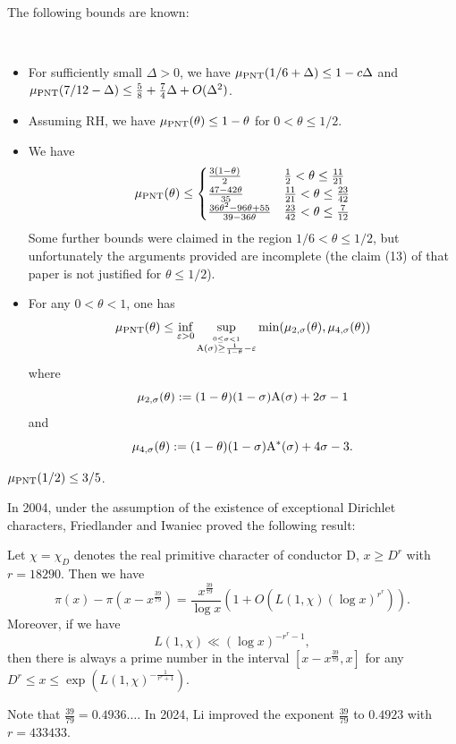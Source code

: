 The following bounds are known:

\begin{lemma}[Bounds on $\mu$]\label{baz-bound}\
  \begin{itemize}
  \item[(i)]  \cite[Theorem 2(i)]{bazzanella-perelli}  For sufficiently small $\Delta>0$, we have $\mu_{\mathrm{PNT}}(1/6 + \Delta) \leq 1 - c\Delta$ and $\mu_{\mathrm{PNT}}(7/12-\Delta) \leq \frac{5}{8} + \frac{7}{4}\Delta + O(\Delta^2)$.
  \item[(ii)] \cite[Theorem 2(ii)]{bazzanella-perelli} Assuming RH, we have $\mu_{\mathrm{PNT}}(\theta) \leq 1-\theta$ for $0 < \theta \leq 1/2$.
    \item[(iii)] \cite[Lemma 1]{bazzanella} We have
  $$
  \mu_{\mathrm{PNT}}(\theta) \leq
  \begin{cases}
  \frac{3(1-\theta)}{2} & \frac{1}{2} < \theta \leq \frac{11}{21} \\
  \frac{47-42\theta}{35}& \frac{11}{21} < \theta \leq \frac{23}{42} \\
  \frac{36\theta^2-96\theta+55}{39-36\theta} & \frac{23}{42} < \theta \leq \frac{7}{12} \\
  \end{cases}
  $$
  Some further bounds were claimed in the region $1/6 < \theta \leq 1/2$, but unfortunately the arguments provided are incomplete (the claim (13) of that paper is not justified for $\theta \leq 1/2$).
  \item[(iv)] \cite{gafni-tao} For any $0 < \theta < 1$, one has
$$\mu_{\mathrm{PNT}}(\theta) \leq \inf_{\varepsilon>0} \sup_{\stackrel{0 \leq \sigma < 1}{\mathrm{A}(\sigma) \geq \frac{1}{1-\theta}-\varepsilon}} \min(\mu_{2,\sigma}(\theta), \mu_{4,\sigma}(\theta))$$
where
$$ \mu_{2,\sigma}(\theta) := (1-\theta)(1-\sigma) \mathrm{A}(\sigma) + 2\sigma - 1$$
and
$$ \mu_{4,\sigma}(\theta) := (1-\theta)(1-\sigma) \mathrm{A}^*(\sigma) + 4\sigma-3.$$
  \end{itemize}
  \item[(v)] \cite[Theorem 2]{heath-brown_differences_2021} $\mu_{\mathrm{PNT}}(1/2) \leq 3/5$.
\end{lemma}


In 2004, under the assumption of the existence of exceptional Dirichlet characters, Friedlander and Iwaniec \cite{FI2004} proved the following result:
\begin{theorem}\cite{FI2004}
Let $\chi=\chi_{D}$ denotes the real primitive character of conductor D, $x \geqslant D^{r}$ with $r=18290$. Then we have
$$
\pi(x) - \pi\left(x-x^{\frac{39}{79}}\right) = \frac{x^{\frac{39}{79}}}{\log x} \left(1 + O\left(L(1, \chi)(\log x)^{r^{r}}\right)\right).
$$
Moreover, if we have
$$
L(1, \chi) \ll (\log x)^{-r^{r}-1},
$$
then there is always a prime number in the interval $\left[x - x^{\frac{39}{79}}, x \right]$ for any $D^{r} \leqslant x \leqslant \exp\left(L(1, \chi)^{- \frac{1}{r^r + 1} } \right)$.
\end{theorem}
Note that $\frac{39}{79} = 0.4936 \dots$. In 2024, Li \cite{li_hybrid_2024} improved the exponent $\frac{39}{79}$ to $0.4923$ with $r=433433$.

